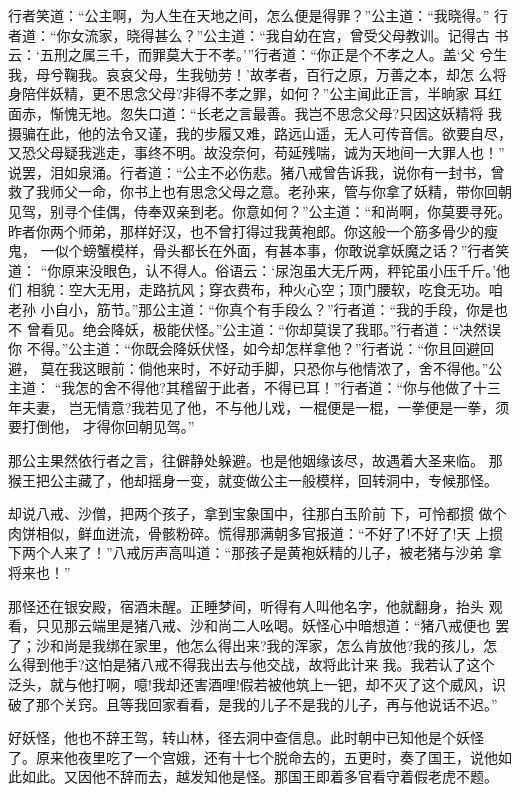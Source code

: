 行者笑道：“公主啊，为人生在天地之间，怎么便是得罪？”公主道：“我晓得。”
行者道：“你女流家，晓得甚么？”公主道：“我自幼在宫，曾受父母教训。记得古
书云：‘五刑之属三千，而罪莫大于不孝。’”行者道：“你正是个不孝之人。盖‘父
兮生我，母兮鞠我。哀哀父母，生我劬劳！’故孝者，百行之原，万善之本，却怎
么将身陪伴妖精，更不思念父母?非得不孝之罪，如何？”公主闻此正言，半晌家
耳红面赤，惭愧无地。忽失口道：“长老之言最善。我岂不思念父母?只因这妖精将
我摄骗在此，他的法令又谨，我的步履又难，路远山遥，无人可传音信。欲要自尽，
又恐父母疑我逃走，事终不明。故没奈何，苟延残喘，诚为天地间一大罪人也！”
说罢，泪如泉涌。行者道：“公主不必伤悲。猪八戒曾告诉我，说你有一封书，曾
救了我师父一命，你书上也有思念父母之意。老孙来，管与你拿了妖精，带你回朝
见驾，别寻个佳偶，侍奉双亲到老。你意如何？”公主道：“和尚啊，你莫要寻死。
昨者你两个师弟，那样好汉，也不曾打得过我黄袍郎。你这般一个筋多骨少的瘦鬼，
一似个螃蟹模样，骨头都长在外面，有甚本事，你敢说拿妖魔之话？”行者笑道：
“你原来没眼色，认不得人。俗语云：‘尿泡虽大无斤两，秤铊虽小压千斤。’他们
相貌：空大无用，走路抗风；穿衣费布，种火心空；顶门腰软，吃食无功。咱老孙
小自小，筋节。”那公主道：“你真个有手段么？”行者道：“我的手段，你是也不
曾看见。绝会降妖，极能伏怪。”公主道：“你却莫误了我耶。”行者道：“决然误你
不得。”公主道：“你既会降妖伏怪，如今却怎样拿他？”行者说：“你且回避回避，
莫在我这眼前：倘他来时，不好动手脚，只恐你与他情浓了，舍不得他。”公主道：
“我怎的舍不得他?其稽留于此者，不得已耳！”行者道：“你与他做了十三年夫妻，
岂无情意?我若见了他，不与他儿戏，一棍便是一棍，一拳便是一拳，须要打倒他，
才得你回朝见驾。”

那公主果然依行者之言，往僻静处躲避。也是他姻缘该尽，故遇着大圣来临。
那猴王把公主藏了，他却摇身一变，就变做公主一般模样，回转洞中，专候那怪。

却说八戒、沙僧，把两个孩子，拿到宝象国中，往那白玉阶前下，可怜都掼
做个肉饼相似，鲜血迸流，骨骸粉碎。慌得那满朝多官报道：“不好了!不好了!天
上掼下两个人来了！”八戒厉声高叫道：“那孩子是黄袍妖精的儿子，被老猪与沙弟
拿将来也！”

那怪还在银安殿，宿酒未醒。正睡梦间，听得有人叫他名字，他就翻身，抬头
观看，只见那云端里是猪八戒、沙和尚二人吆喝。妖怪心中暗想道：“猪八戒便也
罢了；沙和尚是我绑在家里，他怎么得出来?我的浑家，怎么肯放他?我的孩儿，怎
么得到他手?这怕是猪八戒不得我出去与他交战，故将此计来我。我若认了这个
泛头，就与他打啊，噫!我却还害酒哩!假若被他筑上一钯，却不灭了这个威风，识
破了那个关窍。且等我回家看看，是我的儿子不是我的儿子，再与他说话不迟。”

好妖怪，他也不辞王驾，转山林，径去洞中查信息。此时朝中已知他是个妖怪
了。原来他夜里吃了一个宫娥，还有十七个脱命去的，五更时，奏了国王，说他如
此如此。又因他不辞而去，越发知他是怪。那国王即着多官看守着假老虎不题。

